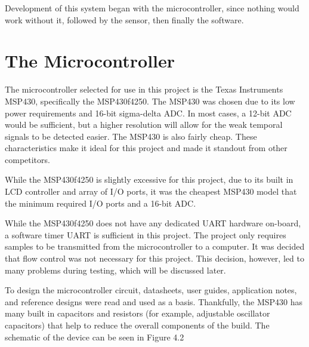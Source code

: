 Development of this system began with the microcontroller, since nothing would work without it, followed by the sensor, then finally the software.

\section{The Microcontroller}

The microcontroller selected for use in this project is the Texas Instruments MSP430, specifically the MSP430f4250. The MSP430 was chosen due to its low power requirements and 16-bit sigma-delta ADC. In most cases, a 12-bit ADC would be sufficient, but a higher resolution will allow for the weak temporal signals to be detected easier. The MSP430 is also fairly cheap. These characteristics make it ideal for this project and made it standout from other competitors. 

While the MSP430f4250 is slightly excessive for this project, due to its built in LCD controller and array of I/O ports, it was the cheapest MSP430 model that the minimum required I/O ports and a 16-bit ADC.

While the MSP430f4250 does not have any dedicated UART hardware on-board, a software timer UART is sufficient in this project. The project only requires samples to be transmitted from the microcontroller to a computer. It was decided that flow control was not necessary for this project. This decision, however, led to many problems during testing, which will be discussed later. 

To design the microcontroller circuit, datasheets, user guides, application notes, and reference designs were read and used as a basis. Thankfully, the MSP430 has many built in capacitors and resistors (for example, adjustable oscillator capacitors) that help to reduce the overall components of the  build. The schematic of the device can be seen in Figure 4.2

